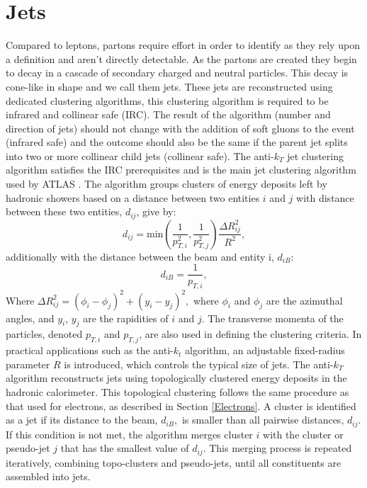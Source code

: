 \section{Jets}
Compared to leptons, partons require effort in order to identify as they rely upon a definition and aren't directly detectable. As the partons are created they begin to decay in a cascade of secondary charged and neutral particles. This decay is cone-like in shape and we call them jets. These jets are reconstructed using dedicated clustering algorithms, this clustering algorithm is required to be infrared and collinear safe (IRC).  The result of the algorithm (number and direction of jets) should not change with the addition of soft gluons to the event (infrared safe) and the outcome should also be the same if the parent jet splits into two or more collinear child jets  (collinear safe). The anti-$k_T$ jet clustering algorithm satisfies the IRC prerequisites and is the main jet clustering algorithm used by ATLAS \cite{cacciari2008anti}. The algorithm groups clusters of energy deposits left by hadronic showers based on a distance between two entities $i$ and $j$ with distance between these two entities, $d_{ij}$, give by:
\begin{equation}
    d_{ij} = \text{min}\left( \frac{1}{p^2_{T,i}} , \frac{1}{p^2_{T,j}}\right) \frac{\Delta R^2_{ij}}{R^2},
\end{equation}
 additionally with the distance between the beam and entity i, $d_{iB}$:
 \begin{equation}
     d_{iB}= \frac{1}{p_{T,i}},
 \end{equation}
 Where $
\Delta R_{ij}^2 = (\phi_i - \phi_j)^2 + (y_i - y_j)^2,$ where \( \phi_i \) and \( \phi_j \) are the azimuthal angles, and \( y_i \), \( y_j \) are the rapidities of $ i $ and $ j $. The transverse momenta of the particles, denoted $ p_{T,i}$ and $p_{T,j}$, are also used in defining the clustering criteria.
In practical applications such as the anti-$k_t$ algorithm, an adjustable fixed-radius parameter $R$ is introduced, which controls the typical size of jets. The anti-$k_T$ algorithm reconstructs jets using topologically clustered energy deposits in the hadronic calorimeter. This topological clustering follows the same procedure as that used for electrons, as described in Section \ref{Electrons}. A cluster is identified as a jet if its distance to the beam, $d_{iB},$ is smaller than all pairwise distances, $d_{ij}.$ If this condition is not met, the algorithm merges cluster $i$ with the cluster or pseudo-jet $j$ that has the smallest value of $d_{ij}$. This merging process is repeated iteratively, combining topo-clusters and pseudo-jets, until all constituents are assembled into jets.
